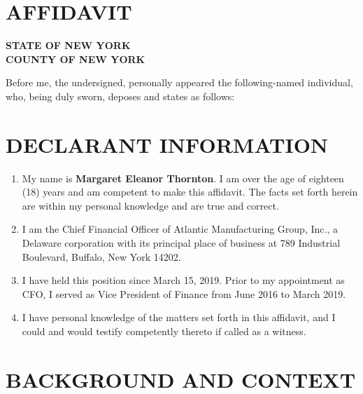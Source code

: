 \documentclass[
    language=english,
    doctype=affidavit,
    institution=none,
]{../../omnilatex}
\begin{document}
\maketitle

\section*{AFFIDAVIT}

\vspace{0.5cm}

\noindent\textbf{STATE OF NEW YORK}\\
\textbf{COUNTY OF NEW YORK}

\vspace{0.5cm}

\noindent Before me, the undersigned, personally appeared the following-named individual, who, being duly sworn, deposes and states as follows:

\section{DECLARANT INFORMATION}

\begin{enumerate}
    \item My name is \textbf{Margaret Eleanor Thornton}. I am over the age of eighteen (18) years and am competent to make this affidavit. The facts set forth herein are within my personal knowledge and are true and correct.
    \item I am the Chief Financial Officer of Atlantic Manufacturing Group, Inc., a Delaware corporation with its principal place of business at 789 Industrial Boulevard, Buffalo, New York 14202.
    \item I have held this position since March 15, 2019. Prior to my appointment as CFO, I served as Vice President of Finance from June 2016 to March 2019.
    \item I have personal knowledge of the matters set forth in this affidavit, and I could and would testify competently thereto if called as a witness.
\end{enumerate}

\section{BACKGROUND AND CONTEXT}
\end{document}
